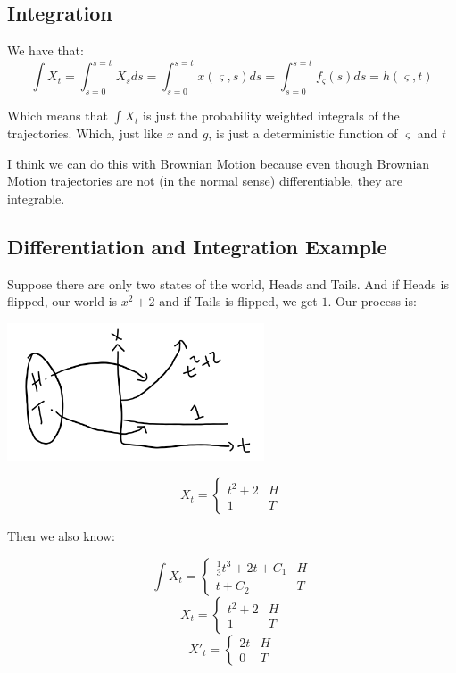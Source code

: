 \documentclass{article}
\begin{document}
\subsection{Integration}
We have that:
$$\int X_t= \int_{s = 0}^{s = t} X_s ds = \int_{s = 0}^{s = t} x\left(\varsigma,s\right) ds = \int_{s = 0}^{s = t} f_\varsigma\left(s\right) ds  = h\left(\varsigma,t\right)$$

Which means that $\int X_t$ is just the probability weighted integrals of the trajectories.  Which, just like $x$ and $g$, is just a deterministic function of $\varsigma$ and $t$

I think we can do this with Brownian Motion because even though Brownian Motion trajectories are not (in the normal sense) differentiable, they are integrable.

\subsection{Differentiation and Integration Example}
Suppose there are only two states of the world, Heads and Tails.  And if Heads is flipped, our world is $x^2 + 2$ and if Tails is flipped, we get $1$.  Our process is:

\includegraphics[width=3in]{ExampleProcess.png}
\centering

\[X_t = \begin{cases} 
    t^2 + 2 & H \\
    1 & T 
 \end{cases}
\]

Then we also know:

\[\int X_t = \begin{cases} 
    \frac{1}{3}t^3 + 2t + C_1 & H \\
    t + C_2 & T 
 \end{cases}
\]
\[X_t = \begin{cases} 
    t^2 + 2 & H \\
    1 & T 
 \end{cases}
\]
\[X'_t = \begin{cases} 
    2t & H \\
    0 & T 
 \end{cases}
\]
\end{document}
